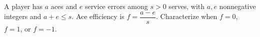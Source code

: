 A player has $a$ aces and $e$ service errors among $s>0$ serves, with $a,e$ nonnegative integers and $a+e\le s$. Ace efficiency is $f=\dfrac{a-e}{s}$. Characterize when $f=0$, $f=1$, or $f=-1$.
